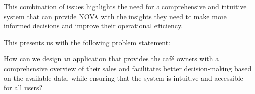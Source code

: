 This combination of issues highlights the need for a comprehensive and intuitive system that can provide NOVA with the
insights they need to make more informed decisions and improve their operational efficiency.

This presents us with the following problem statement:

\begin{tcolorbox}[title=Problem statement]
    How can we design an application that provides the café owners with a comprehensive overview of their sales and
    facilitates better decision-making based on the available data, while ensuring that the system is intuitive and
    accessible for all users?
\end{tcolorbox}
